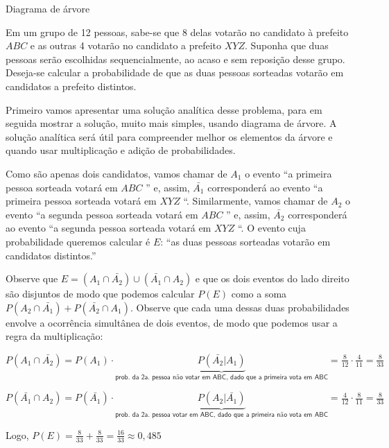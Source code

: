 \begin{example} {Diagrama de árvore}

Em um grupo de 12 pessoas, sabe-se que 8 delas votarão no candidato à prefeito  \(ABC\) e as outras 4 votarão no candidato a prefeito \(XYZ\). Suponha que duas pessoas serão escolhidas sequencialmente, ao acaso e sem reposição desse grupo. Deseja-se calcular a probabilidade de que as duas pessoas sorteadas votarão em candidatos a prefeito distintos.

Primeiro vamos apresentar uma solução analítica desse problema, para em seguida mostrar a solução, muito mais simples, usando diagrama de árvore. A solução analítica será útil para compreender melhor os elementos da árvore e quando usar multiplicação e adição de probabilidades.

Como são apenas dois candidatos, vamos chamar de \(A_1\) o evento “a primeira pessoa sorteada votará em \(ABC\) ” e, assim, \(\bar{A_1}\) corresponderá ao evento “a primeira pessoa sorteada votará em \(XYZ\) “. Similarmente, vamos chamar de \(A_2\) o evento “a segunda pessoa sorteada votará em \(ABC\) ” e, assim, \(\bar{A_2}\) corresponderá ao evento “a segunda pessoa sorteada votará em \(XYZ\) “. O evento cuja probabilidade queremos calcular é \(E\): “as duas pessoas sorteadas votarão em candidatos distintos.”

Observe que \(E=(A_1\cap \bar{A_2})\cup (\bar{A_1}\cap A_2)\)  e que os dois eventos do lado direito são disjuntos de modo que podemos calcular \(P(E)\) como a soma \(P(A_2\cap \bar{A_1})+P(\bar{A_2}\cap A_1)\). Observe que cada uma dessas duas probabilidades envolve a ocorrência simultânea de dois eventos, de modo que podemos usar a regra da multiplicação:

\(P(A_1\cap \bar{A_2})=P({A_1})\cdot \underbrace{P(\bar{A_2}|{A_1})}_{\textsf{prob. da 2a. pessoa não votar em ABC, dado que a primeira vota em ABC}}=\frac{8}{12}\cdot\frac{4}{11}=\frac{8}{33}\)

\(P(\bar{A_1}\cap {A_2})=P(\bar{A_1})\cdot \underbrace{P({A_2}|\bar{A_1})}_{\textsf{prob. da 2a. pessoa votar em ABC, dado que a primeira não vota em ABC}}=\frac{4}{12}\cdot\frac{8}{11}=\frac{8}{33}\)

Logo, \(P(E)=\frac{8}{33}+\frac{8}{33}=\frac{16}{33}\approx 0,485\)


\end{example}
